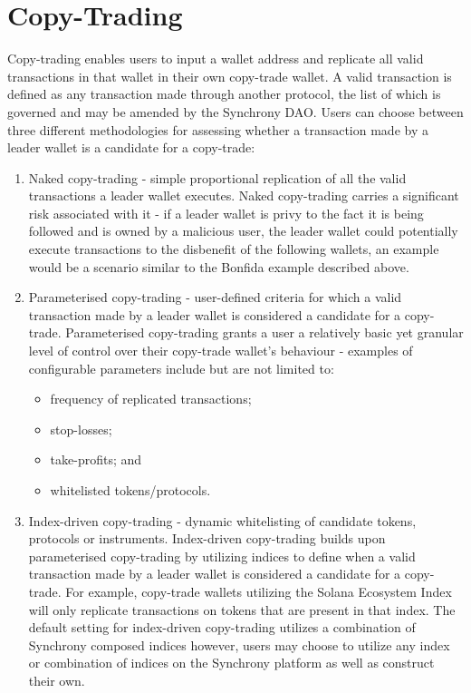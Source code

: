 \documentclass[10pt]{article}
\begin{document}
					\section{Copy-Trading}
					Copy-trading enables users to input a wallet address and replicate all valid
					transactions in that wallet in their own copy-trade wallet. A valid transaction
					is defined as any transaction made through another protocol, the list of which
					is governed and may be amended by the Synchrony DAO. Users can choose between
					three different methodologies for assessing whether a transaction made by
					a leader wallet is a candidate for a copy-trade:
					\begin{enumerate}
						\item Naked copy-trading - simple proportional replication of all the valid
							transactions a leader wallet executes. Naked copy-trading carries
							a significant risk associated with it - if a leader wallet is privy to
							the fact it is being followed and is owned by a malicious user, the
							leader wallet could potentially execute transactions to the disbenefit
							of the following wallets, an example would be a scenario similar to the
							Bonfida example described above.
						\item Parameterised copy-trading - user-defined criteria for which
							a valid transaction made by a leader wallet is considered
							a candidate for a copy-trade. Parameterised copy-trading grants
							a user a relatively basic yet granular level of control over their
							copy-trade wallet's behaviour - examples of configurable parameters 
							include but are not limited to:
							\begin{itemize}
								\item frequency of replicated transactions;
								\item stop-losses;
								\item take-profits; and
								\item whitelisted tokens/protocols.
							\end{itemize}
						\item Index-driven copy-trading - dynamic whitelisting of candidate tokens,
							protocols or instruments. Index-driven copy-trading builds upon
							parameterised copy-trading by utilizing indices to define when a valid
							transaction made by a leader wallet is considered a candidate for
							a copy-trade. For example, copy-trade wallets utilizing the Solana
							Ecosystem Index will only replicate transactions on tokens that are
							present in that index. The default setting for index-driven copy-trading
							utilizes a combination of Synchrony composed indices however, users may
							choose to utilize any index or combination of indices on the Synchrony
							platform as well as construct their own.
					\end{enumerate}
\end{document}
